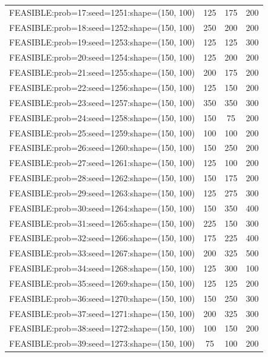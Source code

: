 \begin{longtable}{lccc}
FEASIBLE:prob=17:seed=1251:shape=(150, 100)  &      125 &   175 &    200 \\
FEASIBLE:prob=18:seed=1252:shape=(150, 100)  &      250 &   200 &    200 \\
FEASIBLE:prob=19:seed=1253:shape=(150, 100)  &      125 &   125 &    300 \\
FEASIBLE:prob=20:seed=1254:shape=(150, 100)  &      125 &   200 &    200 \\
FEASIBLE:prob=21:seed=1255:shape=(150, 100)  &      200 &   175 &    200 \\
FEASIBLE:prob=22:seed=1256:shape=(150, 100)  &      125 &   150 &    200 \\
FEASIBLE:prob=23:seed=1257:shape=(150, 100)  &      350 &   350 &    300 \\
FEASIBLE:prob=24:seed=1258:shape=(150, 100)  &      150 &    75 &    200 \\
FEASIBLE:prob=25:seed=1259:shape=(150, 100)  &      100 &   100 &    200 \\
FEASIBLE:prob=26:seed=1260:shape=(150, 100)  &      150 &   250 &    200 \\
FEASIBLE:prob=27:seed=1261:shape=(150, 100)  &      125 &   100 &    200 \\
FEASIBLE:prob=28:seed=1262:shape=(150, 100)  &      150 &   175 &    200 \\
FEASIBLE:prob=29:seed=1263:shape=(150, 100)  &      125 &   275 &    300 \\
FEASIBLE:prob=30:seed=1264:shape=(150, 100)  &      150 &   350 &    400 \\
FEASIBLE:prob=31:seed=1265:shape=(150, 100)  &      225 &   150 &    300 \\
FEASIBLE:prob=32:seed=1266:shape=(150, 100)  &      175 &   225 &    400 \\
FEASIBLE:prob=33:seed=1267:shape=(150, 100)  &      200 &   325 &    500 \\
FEASIBLE:prob=34:seed=1268:shape=(150, 100)  &      125 &   300 &    100 \\
FEASIBLE:prob=35:seed=1269:shape=(150, 100)  &      125 &   125 &    200 \\
FEASIBLE:prob=36:seed=1270:shape=(150, 100)  &      150 &   250 &    300 \\
FEASIBLE:prob=37:seed=1271:shape=(150, 100)  &      200 &   325 &    300 \\
FEASIBLE:prob=38:seed=1272:shape=(150, 100)  &      100 &   150 &    200 \\
FEASIBLE:prob=39:seed=1273:shape=(150, 100)  &       75 &   100 &    200 \\

\end{longtable}
